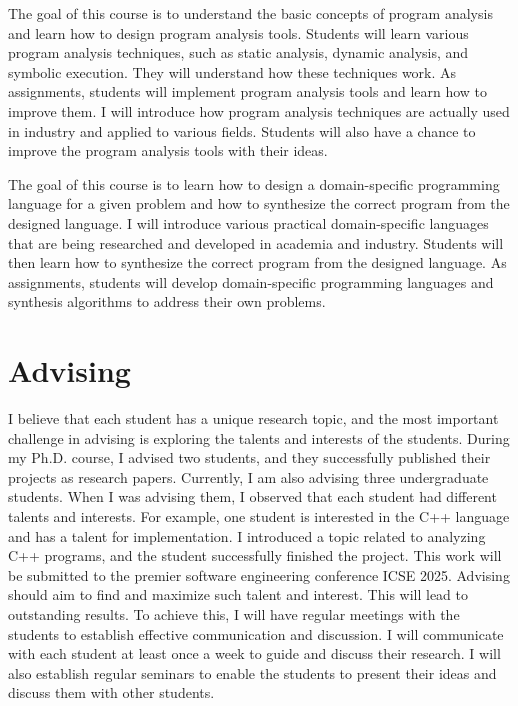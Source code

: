 \documentclass[11pt]{article}
\newcommand{\myparagraph}[1]{\medskip\noindent{\it \textbf{#1.}}}
\begin{document}
\myparagraph{Program Analysis}
The goal of this course is to understand the basic concepts of program analysis and learn how to design program analysis tools. 
%
Students will learn various program analysis techniques, such as static analysis, dynamic analysis, and symbolic execution. They will understand how these techniques work.
%
As assignments, students will implement program analysis tools and learn how to improve them. 
%
I will introduce how program analysis techniques are actually used in industry and applied to various fields.
%
Students will also have a chance to improve the program analysis tools with their ideas.




\myparagraph{Program Synthesis}
The goal of this course is to learn how to design a domain-specific programming language for a given problem and how to synthesize the correct program from the designed language. 
% 
I will introduce various practical domain-specific languages that are being researched and developed in academia and industry.
% 
Students will then learn how to synthesize the correct program from the designed language.
%
As assignments, students will develop domain-specific programming languages and synthesis algorithms to address their own problems.






\section{Advising}
I believe that each student has a unique research topic, and the most important challenge in advising is exploring the talents and interests of the students.
% 
During my Ph.D. course, I advised two students, and they successfully published their projects as research papers. 
% 
Currently, I am also advising three undergraduate students.
% 
When I was advising them, I observed that each student had different talents and interests.
% 
For example, one student is interested in the C++ language and has a talent for implementation.
%
I introduced a topic related to analyzing C++ programs, and the student successfully finished the project. 
%
This work will be submitted to the premier software engineering conference ICSE 2025.
% 
Advising should aim to find and maximize such talent and interest.
%
This will lead to outstanding results.
% 
To achieve this, I will have regular meetings with the students to establish effective communication and discussion.
%  
I will communicate with each student at least once a week to guide and discuss their research.
%
I will also establish regular seminars to enable the students to present their ideas and discuss them with other students.
\end{document}
